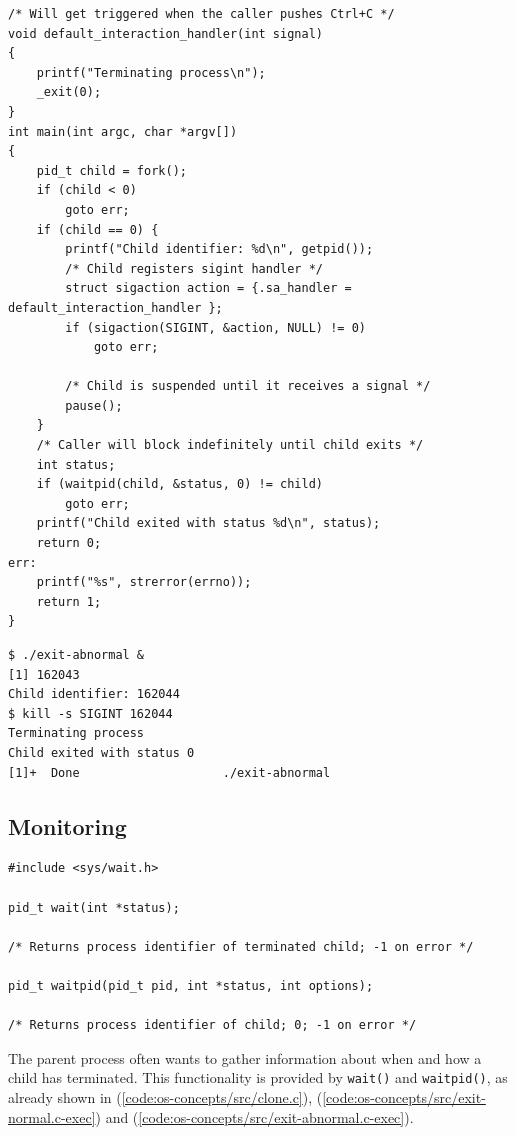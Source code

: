 \begin{lstlisting}[label={code:os-concepts/src/exit-abnormal.c}, style=c-code-snippets, caption={os-concepts/src/exit-abnormal.c}]
/* Will get triggered when the caller pushes Ctrl+C */
void default_interaction_handler(int signal)
{
    printf("Terminating process\n");
    _exit(0);
}
int main(int argc, char *argv[])
{
    pid_t child = fork();
    if (child < 0)
        goto err;
    if (child == 0) {
        printf("Child identifier: %d\n", getpid());
        /* Child registers sigint handler */
        struct sigaction action = {.sa_handler = default_interaction_handler };
        if (sigaction(SIGINT, &action, NULL) != 0)
            goto err;

        /* Child is suspended until it receives a signal */
        pause();
    }
    /* Caller will block indefinitely until child exits */
    int status;
    if (waitpid(child, &status, 0) != child)
        goto err;
    printf("Child exited with status %d\n", status);
    return 0;
err:
    printf("%s", strerror(errno));
    return 1;
}
\end{lstlisting}
\begin{lstlisting}[label={code:os-concepts/src/exit-abnormal.c-exec}, style=bash, caption={os-concepts/src/exit-abnormal.c output}]
$ ./exit-abnormal &
[1] 162043
Child identifier: 162044
$ kill -s SIGINT 162044
Terminating process
Child exited with status 0
[1]+  Done                    ./exit-abnormal
\end{lstlisting}
\subsection{Monitoring}
\label{ch:fundamentals/processes/monitoring}
\begin{lstlisting}[style=syscalls, caption={Wait System Call and Wrappers}]
#include <sys/wait.h>

pid_t wait(int *status);

/* Returns process identifier of terminated child; -1 on error */

pid_t waitpid(pid_t pid, int *status, int options);

/* Returns process identifier of child; 0; -1 on error */
\end{lstlisting}
The parent process often wants to gather information about when and how a child has terminated. 
This functionality is provided by \verb|wait()| and \verb|waitpid()|, as already shown in 
(\ref{code:os-concepts/src/clone.c}), (\ref{code:os-concepts/src/exit-normal.c-exec}) and (\ref{code:os-concepts/src/exit-abnormal.c-exec}).

